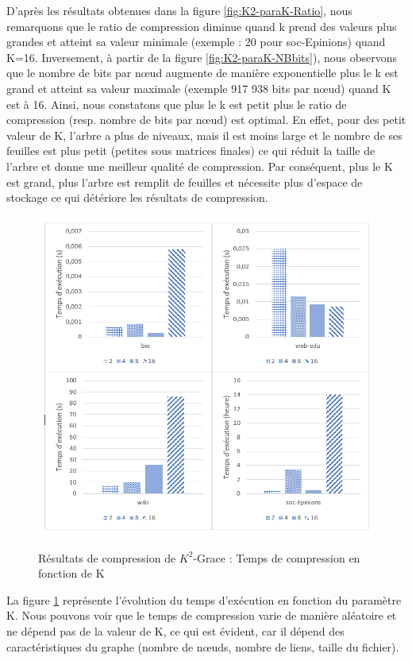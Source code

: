 D'après les résultats obtenues dans la figure \ref{fig:K2-paraK-Ratio}, nous remarquons que le ratio de compression diminue quand k prend des valeurs plus grandes et atteint sa valeur minimale (exemple : 20 pour soc-Epinions) quand K=16. Inversement, à partir de la figure \ref{fig:K2-paraK-NBbits}), nous observons que le nombre de bits par nœud augmente de manière exponentielle plus le k est grand et atteint sa valeur maximale (exemple 917 938 bits par nœud) quand K est à 16. Ainsi, nous constatons que plus le k est petit plus le ratio de compression (resp. nombre de bits par nœud) est optimal. En effet, pour des petit valeur de K, l'arbre a plus de niveaux, mais il est moins large et le nombre de ses feuilles est plus petit (petites sous matrices finales) ce qui réduit la taille de l'arbre et donne une meilleur qualité de compression. Par conséquent, plus le K est grand, plus l'arbre est remplit de feuilles et nécessite plus d'espace de stockage ce qui détériore les résultats de compression.


\begin{figure}[H]
	\centering
	\includegraphics[scale=0.9]{ressources/image/Tests/K2-Texec.png}
	\label{fig:K2-Texec}
	\caption{Résultats de compression de $K^2$-Grace : Temps de compression en fonction de K}
\end{figure}

La figure \ref{fig:K2-Texec} représente l'évolution du temps d'exécution en fonction du paramètre K. Nous pouvons voir que le temps de compression varie de manière aléatoire et ne dépend pas de la valeur de K, ce qui est évident, car il dépend des caractéristiques du graphe (nombre de nœuds, nombre de liens, taille du fichier). 
			
